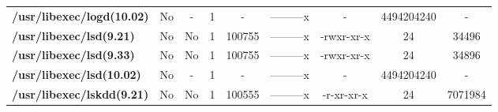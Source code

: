 \begin{center}
{\begin{tabular}{|>{\bfseries} l | C | C | C | C | C | C | C | C |}
					/usr/libexec/logd(10.02) & No & - & 1 & - & ---------x & - & 4494204240 & -\\ 
					/usr/libexec/lsd(9.21) & No & No & \color{green}1 & \color{red}100755 & \color{green}---------x & \color{red}-rwxr-xr-x & \color{green}24 & \color{red}34496\\ 
					/usr/libexec/lsd(9.33) & No & No & \color{green}1 & \color{red}100755 & \color{green}---------x & \color{red}-rwxr-xr-x & \color{green}24 & \color{red}34896\\ 
					/usr/libexec/lsd(10.02) & No & - & 1 & - & ---------x & - & 4494204240 & -\\ 
					/usr/libexec/lskdd(9.21) & No & No & \color{green}1 & \color{red}100555 & \color{green}---------x & \color{red}-r-xr-xr-x & \color{green}24 & \color{red}7071984\\ 

			\end{tabular}
		}
	\end{center}



